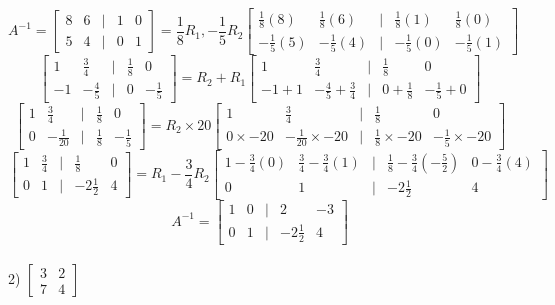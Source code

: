 \documentclass[a4paper]{article}
\begin{document}
\[A^{-1} = 
\begin{bmatrix}
8&6&|&1&0\\
5&4&|&0&1
\end{bmatrix} = \frac{1}{8}R_1 , -\frac{1}{5}R_2
\begin{bmatrix}
\frac{1}{8}(8)&\frac{1}{8}(6)&|&\frac{1}{8}(1)&\frac{1}{8}(0)\\
-\frac{1}{5}(5)&-\frac{1}{5}(4)&|&-\frac{1}{5}(0)&-\frac{1}{5}(1)
\end{bmatrix}\]
\[
\begin{bmatrix}
1&\frac{3}{4}&|&\frac{1}{8}&0\\
-1&-\frac{4}{5}&|&0&-\frac{1}{5}
\end{bmatrix} = R_2+R_1
\begin{bmatrix}
1&\frac{3}{4}&|&\frac{1}{8}&0\\
-1+1&-\frac{4}{5}+\frac{3}{4}&|&0+\frac{1}{8}&-\frac{1}{5}+0
\end{bmatrix}
\]
\[
\begin{bmatrix}
1&\frac{3}{4}&|&\frac{1}{8}&0\\
0&-\frac{1}{20}&|&\frac{1}{8}&-\frac{1}{5}
\end{bmatrix} =R_2\times20
\begin{bmatrix}
1&\frac{3}{4}&|&\frac{1}{8}&0\\
0\times-20&-\frac{1}{20}\times-20&|&\frac{1}{8}\times-20&-\frac{1}{5}\times-20
\end{bmatrix}
\]
\[
\begin{bmatrix}
1&\frac{3}{4}&|&\frac{1}{8}&0\\
0&1&|&-2\frac{1}{2}&4
\end{bmatrix} = R_1-\frac{3}{4}R_2
\begin{bmatrix}
1-\frac{3}{4}(0)&\frac{3}{4}-\frac{3}{4}(1)&|&\frac{1}{8}-\frac{3}{4}(-\frac{5}{2})&0-\frac{3}{4}(4)\\
0&1&|&-2\frac{1}{2}&4
\end{bmatrix}
\]
\[A^{-1} =
\begin{bmatrix}
1&0&|&2&-3\\
0&1&|&-2\frac{1}{2}&4
\end{bmatrix}
\]\\

2) $\begin{bmatrix}
3&2\\
7&4
\end{bmatrix}$
\end{document}
